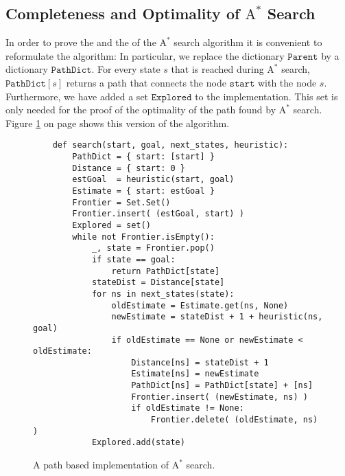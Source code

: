 \subsection{Completeness and Optimality of $\textrm{A}^*$ Search}
In order to prove the  and the  of the $\textrm{A}^*$ search algorithm it is convenient to
reformulate the algorithm:  In particular, we replace the dictionary $\texttt{Parent}$ by a dictionary
$\texttt{PathDict}$. For every state $s$ that is reached during $\textrm{A}^*$ search, $\texttt{PathDict}[s]$ returns a
path that connects the node $\texttt{start}$ with the node $s$.  Furthermore, we have added a set
$\texttt{Explored}$ to the implementation.  This set is only needed for the proof of the optimality of
the path found by $\mathrm{A}^*$ search.  Figure \ref{fig:A-Star-Search-Path.ipynb} on page
\pageref{fig:A-Star-Search-Path.ipynb} shows this version of the algorithm.


\begin{figure}[!ht]
\centering
\begin{verbatim}
    def search(start, goal, next_states, heuristic):
        PathDict = { start: [start] }
        Distance = { start: 0 }           
        estGoal  = heuristic(start, goal)
        Estimate = { start: estGoal }
        Frontier = Set.Set()
        Frontier.insert( (estGoal, start) )
        Explored = set()
        while not Frontier.isEmpty():
            _, state = Frontier.pop()
            if state == goal:
                return PathDict[state]
            stateDist = Distance[state]
            for ns in next_states(state):
                oldEstimate = Estimate.get(ns, None)
                newEstimate = stateDist + 1 + heuristic(ns, goal)
                if oldEstimate == None or newEstimate < oldEstimate:
                    Distance[ns] = stateDist + 1
                    Estimate[ns] = newEstimate
                    PathDict[ns] = PathDict[state] + [ns]
                    Frontier.insert( (newEstimate, ns) )
                    if oldEstimate != None:
                        Frontier.delete( (oldEstimate, ns) )
            Explored.add(state)
\end{verbatim}
\vspace*{-0.3cm}
\caption{A path based implementation of $\textrm{A}^*$ search.}
\label{fig:A-Star-Search-Path.ipynb}
\end{figure}



